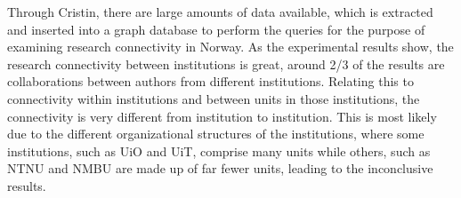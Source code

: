 Through Cristin, there are large amounts of data available, which is extracted and inserted into a graph database to perform the queries for the purpose of examining research connectivity in Norway.
As the experimental results show, the research connectivity between institutions is great, around 2/3 of the results are collaborations between authors from different institutions.
Relating this to connectivity within institutions and between units in those institutions, the connectivity is very different from institution to institution.
This is most likely due to the different organizational structures of the institutions, where some institutions, such as UiO and UiT, comprise many units while others, such as NTNU and NMBU are made up of far fewer units, leading to the inconclusive results.
